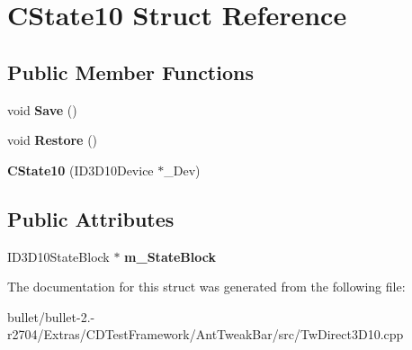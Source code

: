\hypertarget{struct_c_state10}{\section{C\+State10 Struct Reference}
\label{struct_c_state10}
}
\subsection*{Public Member Functions}
\begin{DoxyCompactItemize}
\item 
\hypertarget{struct_c_state10_aab20f4df1dd3c77816bd21e8d8420e96}{void {\bfseries Save} ()}\label{struct_c_state10_aab20f4df1dd3c77816bd21e8d8420e96}

\item 
\hypertarget{struct_c_state10_a85de0de7c0ea8614ea57975388663688}{void {\bfseries Restore} ()}\label{struct_c_state10_a85de0de7c0ea8614ea57975388663688}

\item 
\hypertarget{struct_c_state10_af7ab7b9ee994e0db195d98a16ba0c1d2}{{\bfseries C\+State10} (I\+D3\+D10\+Device $\ast$\+\_\+\+Dev)}\label{struct_c_state10_af7ab7b9ee994e0db195d98a16ba0c1d2}

\end{DoxyCompactItemize}
\subsection*{Public Attributes}
\begin{DoxyCompactItemize}
\item 
\hypertarget{struct_c_state10_ac581f6af67218e700d36bb66e46ad203}{I\+D3\+D10\+State\+Block $\ast$ {\bfseries m\+\_\+\+State\+Block}}\label{struct_c_state10_ac581f6af67218e700d36bb66e46ad203}

\end{DoxyCompactItemize}


The documentation for this struct was generated from the following file\+:\begin{DoxyCompactItemize}
\item 
bullet/bullet-\/2.-\/r2704/\+Extras/\+C\+D\+Test\+Framework/\+Ant\+Tweak\+Bar/src/Tw\+Direct3\+D10.\+cpp\end{DoxyCompactItemize}
